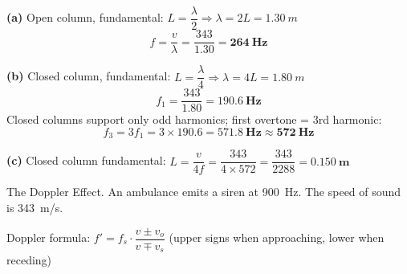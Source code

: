 \documentclass[addpoints]{exam}
\begin{document}
\begin{questions}
\begin{solution}[9cm]
\textbf{(a)} Open column, fundamental: $L = \dfrac{\lambda}{2} \Rightarrow \lambda = 2L = \SI{1.30}{m}$
\[
f = \frac{v}{\lambda} = \frac{343}{1.30} = \mathbf{\SI{264}{Hz}}
\]

\textbf{(b)} Closed column, fundamental: $L = \dfrac{\lambda}{4} \Rightarrow \lambda = 4L = \SI{1.80}{m}$
\[
f_1 = \frac{343}{1.80} = \mathbf{\SI{190.6}{Hz}}
\]
Closed columns support only odd harmonics; first overtone = 3rd harmonic:
\[
f_3 = 3 f_1 = 3 \times 190.6 = \mathbf{\SI{571.8}{Hz} \approx \SI{572}{Hz}}
\]

\textbf{(c)} Closed column fundamental: $L = \dfrac{v}{4f} = \dfrac{343}{4 \times 572}
= \dfrac{343}{2288} = \mathbf{\SI{0.150}{m}}$
\end{solution}

\question The Doppler Effect.
An ambulance emits a siren at \SI{900}{Hz}. The speed of sound is \SI{343}{m/s}.
\begin{solution}[9cm]
Doppler formula: $f' = f_s \cdot \dfrac{v \pm v_o}{v \mp v_s}$
(upper signs when approaching, lower when receding)


\end{solution}
\end{questions}
\end{document}
